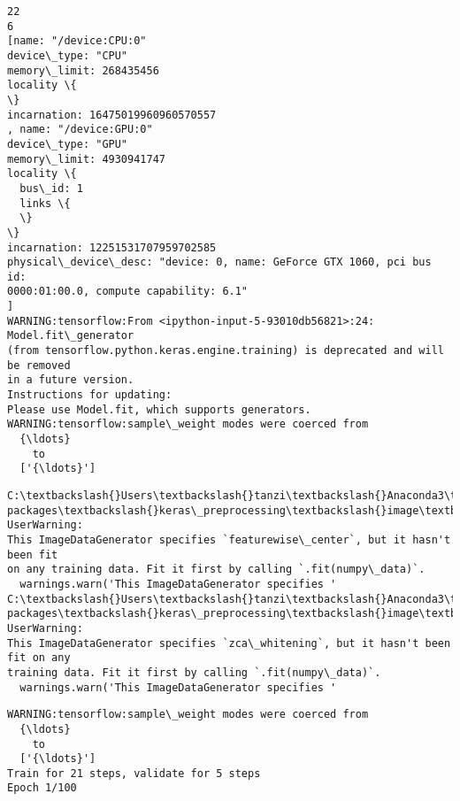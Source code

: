 \documentclass[11pt]{article}
\begin{document}
    \begin{Verbatim}[commandchars=\\\{\}]
22
6
[name: "/device:CPU:0"
device\_type: "CPU"
memory\_limit: 268435456
locality \{
\}
incarnation: 16475019960960570557
, name: "/device:GPU:0"
device\_type: "GPU"
memory\_limit: 4930941747
locality \{
  bus\_id: 1
  links \{
  \}
\}
incarnation: 12251531707959702585
physical\_device\_desc: "device: 0, name: GeForce GTX 1060, pci bus id:
0000:01:00.0, compute capability: 6.1"
]
WARNING:tensorflow:From <ipython-input-5-93010db56821>:24: Model.fit\_generator
(from tensorflow.python.keras.engine.training) is deprecated and will be removed
in a future version.
Instructions for updating:
Please use Model.fit, which supports generators.
WARNING:tensorflow:sample\_weight modes were coerced from
  {\ldots}
    to
  ['{\ldots}']
    \end{Verbatim}

    \begin{Verbatim}[commandchars=\\\{\}]
C:\textbackslash{}Users\textbackslash{}tanzi\textbackslash{}Anaconda3\textbackslash{}lib\textbackslash{}site-
packages\textbackslash{}keras\_preprocessing\textbackslash{}image\textbackslash{}image\_data\_generator.py:716: UserWarning:
This ImageDataGenerator specifies `featurewise\_center`, but it hasn't been fit
on any training data. Fit it first by calling `.fit(numpy\_data)`.
  warnings.warn('This ImageDataGenerator specifies '
C:\textbackslash{}Users\textbackslash{}tanzi\textbackslash{}Anaconda3\textbackslash{}lib\textbackslash{}site-
packages\textbackslash{}keras\_preprocessing\textbackslash{}image\textbackslash{}image\_data\_generator.py:735: UserWarning:
This ImageDataGenerator specifies `zca\_whitening`, but it hasn't been fit on any
training data. Fit it first by calling `.fit(numpy\_data)`.
  warnings.warn('This ImageDataGenerator specifies '
    \end{Verbatim}

    \begin{Verbatim}[commandchars=\\\{\}]
WARNING:tensorflow:sample\_weight modes were coerced from
  {\ldots}
    to
  ['{\ldots}']
Train for 21 steps, validate for 5 steps
Epoch 1/100
    \end{Verbatim}
\end{document}
